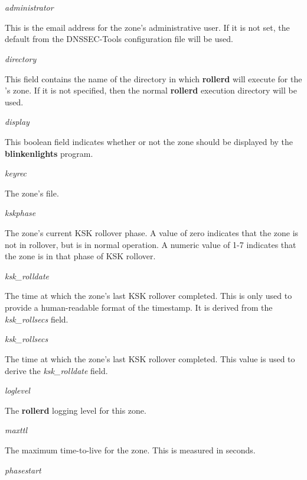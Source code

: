\begin{description}

\item {\it administrator}\verb" "

This is the email address for the zone's administrative user.  If it is not
set, the default from the DNSSEC-Tools configuration file will be used.

\item {\it directory}\verb" "

This field contains the name of the directory in which {\bf rollerd} will
execute for the 's zone.  If it is not specified, then the
normal {\bf rollerd} execution directory will be used.

\item {\it display}\verb" "

This boolean field indicates whether or not the zone should be displayed by
the {\bf blinkenlights} program.

\item {\it keyrec}\verb" "

The zone's  file.

\item {\it kskphase}\verb" "

The zone's current KSK rollover phase.  A value of zero indicates that the
zone is not in rollover, but is in normal operation.  A numeric value of 1-7
indicates that the zone is in that phase of KSK rollover.

\item {\it ksk\_rolldate}\verb" "

The time at which the zone's last KSK rollover completed.  This is only used
to provide a human-readable format of the timestamp.  It is derived from the
{\it ksk\_rollsecs} field.

\item {\it ksk\_rollsecs}\verb" "

The time at which the zone's last KSK rollover completed.  This value is used
to derive the {\it ksk\_rolldate} field.

\item {\it loglevel}\verb" "

The {\bf rollerd} logging level for this zone.

\item {\it maxttl}\verb" "

The maximum time-to-live for the zone.  This is measured in seconds.

\item {\it phasestart}\verb" "


\end{description}
